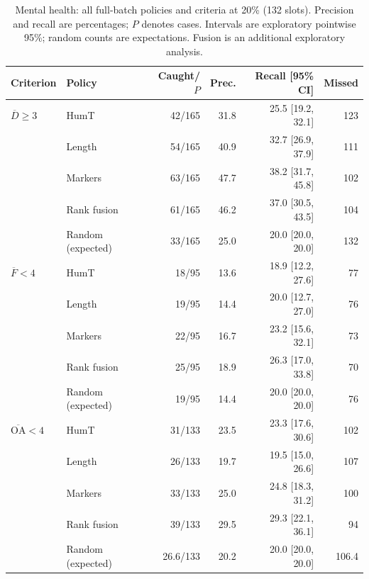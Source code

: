 \begin{table}[htbp]
\centering\small
\caption{Mental health: all full-batch policies and criteria at 20\% (132 slots). Precision and recall are percentages; $P$ denotes cases. Intervals are exploratory pointwise 95\%; random counts are expectations. Fusion is an additional exploratory analysis.}
\label{tab:full_mental_health}
\begin{tabular}{llrrrr}
\toprule
Criterion & Policy & Caught/$P$ & Prec. & Recall [95\% CI] & Missed \\
\midrule
$\overline D\geq3$ & HumT & 42/165 & 31.8 & 25.5 [19.2, 32.1] & 123 \\
 & Length & 54/165 & 40.9 & 32.7 [26.9, 37.9] & 111 \\
 & Markers & 63/165 & 47.7 & 38.2 [31.7, 45.8] & 102 \\
 & Rank fusion & 61/165 & 46.2 & 37.0 [30.5, 43.5] & 104 \\
 & Random (expected) & 33/165 & 25.0 & 20.0 [20.0, 20.0] & 132 \\
$\overline F<4$ & HumT & 18/95 & 13.6 & 18.9 [12.2, 27.6] & 77 \\
 & Length & 19/95 & 14.4 & 20.0 [12.7, 27.0] & 76 \\
 & Markers & 22/95 & 16.7 & 23.2 [15.6, 32.1] & 73 \\
 & Rank fusion & 25/95 & 18.9 & 26.3 [17.0, 33.8] & 70 \\
 & Random (expected) & 19/95 & 14.4 & 20.0 [20.0, 20.0] & 76 \\
$\overline{\mathrm{OA}}<4$ & HumT & 31/133 & 23.5 & 23.3 [17.6, 30.6] & 102 \\
 & Length & 26/133 & 19.7 & 19.5 [15.0, 26.6] & 107 \\
 & Markers & 33/133 & 25.0 & 24.8 [18.3, 31.2] & 100 \\
 & Rank fusion & 39/133 & 29.5 & 29.3 [22.1, 36.1] & 94 \\
 & Random (expected) & 26.6/133 & 20.2 & 20.0 [20.0, 20.0] & 106.4 \\
\bottomrule
\end{tabular}
\end{table}
